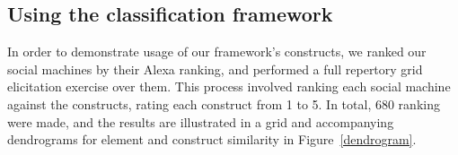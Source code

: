 \documentclass{sig-alternate}
\begin{document}

\subsection{Using the classification framework}
\label{sec:usage}
In order to demonstrate usage of our framework's constructs, we ranked our social machines
by their Alexa ranking, and performed a full repertory grid elicitation exercise over them.
This process involved ranking each social machine against the constructs, rating each construct
from 1 to 5. In total, $680$ ranking were made, and the
results are illustrated in a grid and accompanying dendrograms for element and construct
similarity in Figure~\ref{dendrogram}.
\end{document}
